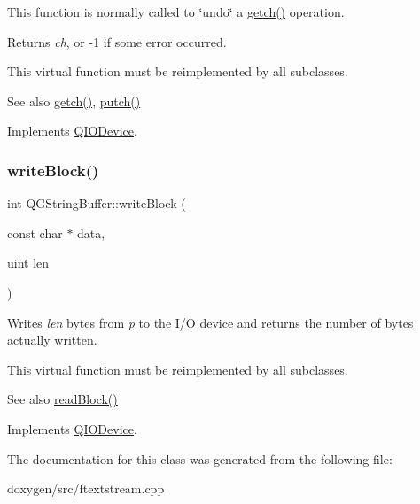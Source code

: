 This function is normally called to \char`\"{}undo\char`\"{} a \mbox{\hyperlink{class_q_g_string_buffer_a20699e4c4ba6d7d68c4422d795412751}{getch()}} operation.

Returns {\itshape ch}, or -\/1 if some error occurred.

This virtual function must be reimplemented by all subclasses.

\begin{DoxySeeAlso}{See also}
\mbox{\hyperlink{class_q_g_string_buffer_a20699e4c4ba6d7d68c4422d795412751}{getch()}}, \mbox{\hyperlink{class_q_g_string_buffer_ae2265be83385ba58ff0e47880563bbb5}{putch()}} 
\end{DoxySeeAlso}


Implements \mbox{\hyperlink{class_q_i_o_device_aae3d67422103e8fc0411297b1d62c29a}{Q\+I\+O\+Device}}.

\mbox{\label{class_q_g_string_buffer_aab6c9a7bfbc048b4adff01f4bf920efa}} 
\subsubsection{\texorpdfstring{writeBlock()}{writeBlock()}}
{\footnotesize\ttfamily int Q\+G\+String\+Buffer\+::write\+Block (\begin{DoxyParamCaption}\item[{const char $\ast$}]{data,  }\item[{uint}]{len }\end{DoxyParamCaption})\hspace{0.3cm}{\ttfamily [virtual]}}

Writes {\itshape len} bytes from {\itshape p} to the I/O device and returns the number of bytes actually written.

This virtual function must be reimplemented by all subclasses.

\begin{DoxySeeAlso}{See also}
\mbox{\hyperlink{class_q_g_string_buffer_aa5ab1052c6a1a9365418f55c55022fb2}{read\+Block()}} 
\end{DoxySeeAlso}


Implements \mbox{\hyperlink{class_q_i_o_device_a5d937df1bde2f956872dd54e077807d1}{Q\+I\+O\+Device}}.



The documentation for this class was generated from the following file\+:\begin{DoxyCompactItemize}
\item 
doxygen/src/ftextstream.\+cpp\end{DoxyCompactItemize}
